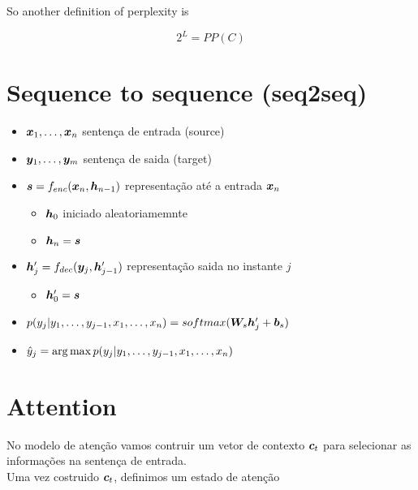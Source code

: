 So another definition of perplexity is

\begin{equation}
2^{L} = PP(C)
\end{equation}





\section{Sequence to sequence (seq2seq)}
\label{sec:Seq2seq}

\begin{itemize}
\item $\bm{x}_1, \dots, \bm{x}_n$ sentença de entrada (source)
\item $\bm{y}_1, \dots, \bm{y}_m$ sentença de saida (target)
\item $\bm{s} = f_{enc}(\bm{x}_n, \bm{h}_{n-1})$ representação  até a entrada $\bm{x}_n$
\begin{itemize}
\item $\bm{h}_0$ iniciado aleatoriamemnte
\item $\bm{h}_n = \bm{s}$  
\end{itemize}
\item $\bm{h}^{\prime}_j = f_{dec}(\bm{y}_j, \bm{h}^{\prime}_{j-1})$ representação saida no instante $j$
\begin{itemize}
\item $\bm{h}^{\prime}_0 = \bm{s}$
\end{itemize}

\item $p(y_j | y_1, \dots, y_{j-1}, x_1, \dots, x_{n}) = softmax(\bm{W}_{s}  \bm{h}^{\prime}_j + \bm{b}_s)$
\item $\hat{y}_j = \operatorname*{arg\,max} p(y_j | y_1, \dots, y_{j-1}, x_1, \dots, x_{n})$

\end{itemize}



\section{Attention}
\label{sec:Attention}

 No modelo de atenção vamos contruir um vetor de contexto $\bm{c}_t$ para selecionar as informações na sentença de entrada.\\
 Uma vez costruido $\bm{c}_t$, definimos um estado de atenção

